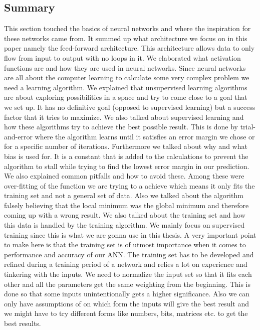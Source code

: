 \subsection{Summary}
This section touched the basics of neural networks and where the inspiration for these networks came from. It summed up what architecture we focus on in this paper namely the feed-forward architecture. This architecture allows data to only flow from input to output with no loops in it. We elaborated what activation functions are and how they are used in neural networks. Since neural networks are all about the computer learning to calculate some very complex problem we need a learning algorithm. We explained that unsupervised learning algorithms are about exploring possibilities in a space and try to come close to a goal that we set up. It has no definitive goal (opposed to supervised learning) but a success factor that it tries to maximize. We also talked about supervised learning and how these algorithms try to achieve the best possible result. This is done by trial-and-error where the algorithm learns until it satisfies an error margin we chose or for a specific number of iterations. Furthermore we talked about why and what bias is used for. It is a constant that is added to the calculations to prevent the algorithm to stall while trying to find the lowest error margin in our prediction. We also explained common pitfalls and how to avoid these. Among these were over-fitting of the function we are trying to a achieve which means it only fits the training set and not a general set of data. Also we talked about the algorithm falsely believing that the local minimum was the global minimum and therefore coming up with a wrong result.
We also talked about the training set and how this data is handled by the training algorithm. We mainly focus on supervised training since this is what we are gonna use in this thesis. A very important point to make here is that the training set is of utmost importance when it comes to performance and accuracy of our ANN. The training set has to be developed and refined during a training period of a network and relies a lot on experience and tinkering with the inputs. We need to normalize the input set so that it fits each other and all the parameters get the same weighting from the beginning. This is done so that some inputs unintentionally gets a higher significance. Also we can only have assumptions of on which form the inputs will give the best result and we might have to try different forms like numbers, bits, matrices etc. to get the best results.